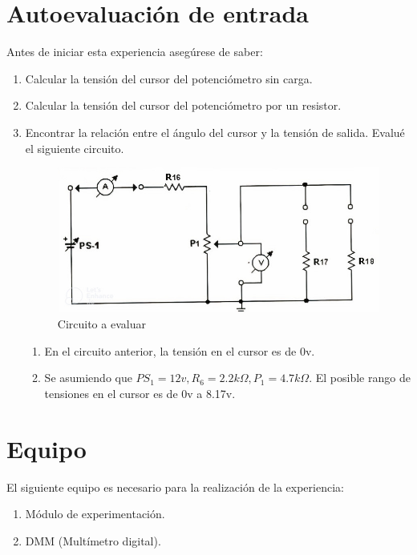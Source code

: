 \section{Autoevaluación de entrada}
Antes de iniciar esta experiencia asegúrese de saber:
\begin{enumerate}
	\item Calcular la tensión del cursor del potenciómetro sin carga.
	\item Calcular la tensión del cursor del potenciómetro por un resistor.
	\item Encontrar la relación entre el ángulo del cursor y la tensión de salida. Evalué el siguiente circuito.
	\begin{figure}[h]
		\centering
		\includegraphics[scale=0.5]{imagenes/1}
		\caption{Circuito a evaluar}
	\end{figure}
	\begin{enumerate}
		\item En el circuito anterior, la tensión en el cursor es de 0v.
		\item Se asumiendo que $PS_1 = 12v, R_{6}= 2.2k\Omega, P_{1}= 4.7k\Omega$. El posible rango de tensiones en el cursor es de 0v a 8.17v. 
	\end{enumerate}
\end{enumerate}
\section{Equipo}
El siguiente equipo es necesario para la realización de la experiencia:
\begin{enumerate}
	\item Módulo de experimentación.
	\item DMM (Multímetro digital).
\end{enumerate}

